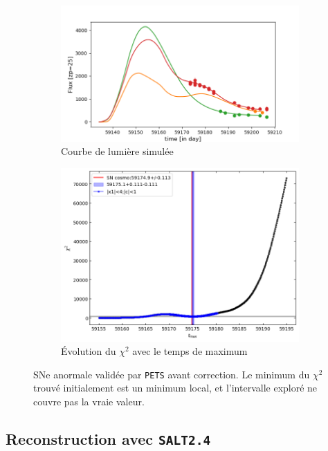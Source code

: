 \documentclass{book}
\def\pets{\texttt{PETS}\xspace}
\def\saltd{\texttt{SALT2.4}\xspace}
\begin{document}
\begin{figure}[h]
	\begin{subfigure}{0.45\textwidth}
		\centering
		\includegraphics[width=\textwidth]{figures/544_lc_truth.png}
		\caption{Courbe de lumière simulée}
	\end{subfigure}
	\hfill
	\begin{subfigure}{0.45\textwidth}
		\centering
		\includegraphics[width=\textwidth]{figures/544_Tmaxgrid.png}
		\caption{Évolution du $\chi^2$ avec le temps de maximum}
	\end{subfigure}
	\caption{SNe anormale validée par \pets avant correction. Le minimum du $\chi^2$ trouvé initialement est un minimum local, et l'intervalle exploré ne couvre pas la vraie valeur. }
	\label{fig:pets_worst}
\end{figure}

\subsection{Reconstruction avec \saltd}
\end{document}
